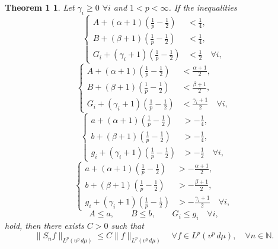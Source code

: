 \documentclass[a4paper,12pt]{article}
\theoremstyle{plain}
\newtheorem*{theoremOne}{Theorem 1}
\theoremstyle{definition}
\newcommand{\N}{\mathbb{N}}
\begin{document}
\begin{theoremOne}
Let $\gamma_{i} \geq 0$ $\forall i$ and $1 < p < \infty$.
If the inequalities
\begin{equation}
\left\{
\begin{aligned}
A + (\alpha+1) \left(\frac{1}{p} - \frac{1}{2}\right) &< \frac{1}{4}, \\
B + (\beta+1) \left(\frac{1}{p} - \frac{1}{2}\right) &< \frac{1}{4}, \\
G_{i} + (\gamma_{i}+1) \left(\frac{1}{p} - \frac{1}{2}\right) &< \frac{1}{2}
\quad \forall i,
\end{aligned}
\right.
\tag{2}
\end{equation}
\begin{equation}
\left\{
\begin{aligned}
A + (\alpha+1) \left(\frac{1}{p} - \frac{1}{2}\right) &< \frac{\alpha+1}{2}, \\
B + (\beta+1) \left(\frac{1}{p} - \frac{1}{2}\right) &< \frac{\beta+1}{2}, \\
G_{i} + (\gamma_{i}+1) \left(\frac{1}{p} - \frac{1}{2}\right) &< \frac{\gamma_{i}+1}{2}
\quad \forall i,
\end{aligned}
\right.
\tag{3}
\end{equation}
\begin{equation}
\left\{
\begin{aligned}
a + (\alpha+1) \left(\frac{1}{p} - \frac{1}{2}\right) &> - \frac{1}{4}, \\
b + (\beta+1) \left(\frac{1}{p} - \frac{1}{2}\right) &> - \frac{1}{4}, \\
g_{i} + (\gamma_{i}+1) \left(\frac{1}{p} - \frac{1}{2}\right) &> - \frac{1}{2}
\quad \forall i,
\end{aligned}
\right.
\tag{4}
\end{equation}
\begin{equation}
\left\{
\begin{aligned}
a + (\alpha+1) \left(\frac{1}{p} - \frac{1}{2}\right) &> - \frac{\alpha+1}{2}, \\
b + (\beta+1) \left(\frac{1}{p} - \frac{1}{2}\right) &> - \frac{\beta+1}{2}, \\
g_{i} + (\gamma_{i}+1) \left(\frac{1}{p} - \frac{1}{2}\right) &> - \frac{\gamma_{i}+1}{2}
\quad \forall i,
\end{aligned}
\right.
\tag{5}
\end{equation}
\begin{equation}
A \leq a, \qquad B \leq b, \qquad G_{i} \leq g_{i}
\quad \forall i,
\tag{6}
\end{equation}
hold, then there exists $C > 0$ such that
$$
\| S_{n}f \|_{L^{p}(u^{p}\,d\mu)}
\leq C \| f \|_{L^{p}(v^{p}\,d\mu)}
\quad \forall f \in L^{p}(v^{p}\,d\mu),
\quad \forall n \in \N.
$$
\end{theoremOne}
\end{document}
